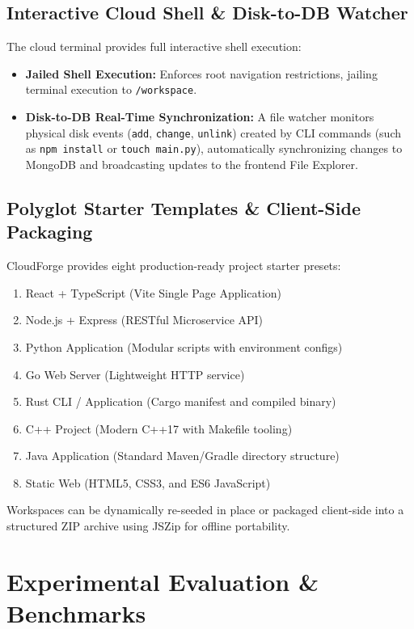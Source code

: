 \documentclass[conference]{IEEEtran}
\begin{document}
\subsection{Interactive Cloud Shell \& Disk-to-DB Watcher}
The cloud terminal provides full interactive shell execution:
\begin{itemize}
    \item \textbf{Jailed Shell Execution:} Enforces root navigation restrictions, jailing terminal execution to \texttt{/workspace}.
    \item \textbf{Disk-to-DB Real-Time Synchronization:} A file watcher monitors physical disk events (\texttt{add}, \texttt{change}, \texttt{unlink}) created by CLI commands (such as \texttt{npm install} or \texttt{touch main.py}), automatically synchronizing changes to MongoDB and broadcasting updates to the frontend File Explorer.
\end{itemize}

\subsection{Polyglot Starter Templates \& Client-Side Packaging}
CloudForge provides eight production-ready project starter presets:
\begin{enumerate}
    \item React + TypeScript (Vite Single Page Application)
    \item Node.js + Express (RESTful Microservice API)
    \item Python Application (Modular scripts with environment configs)
    \item Go Web Server (Lightweight HTTP service)
    \item Rust CLI / Application (Cargo manifest and compiled binary)
    \item C++ Project (Modern C++17 with Makefile tooling)
    \item Java Application (Standard Maven/Gradle directory structure)
    \item Static Web (HTML5, CSS3, and ES6 JavaScript)
\end{enumerate}
Workspaces can be dynamically re-seeded in place or packaged client-side into a structured ZIP archive using JSZip for offline portability.

\section{Experimental Evaluation \& Benchmarks}
\end{document}
